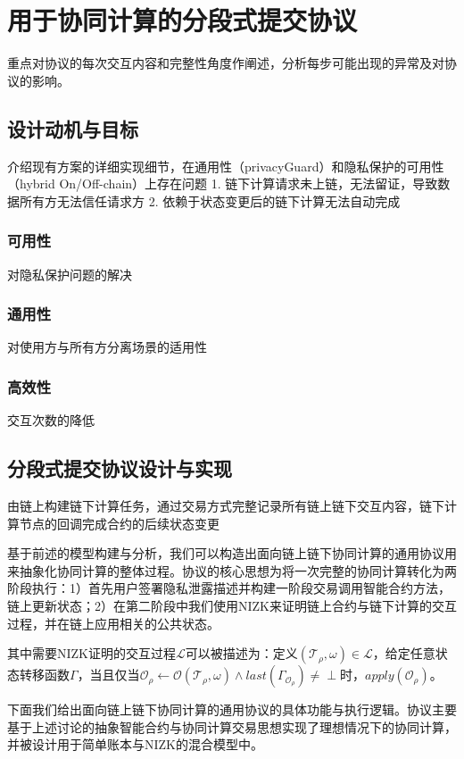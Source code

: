 \chapter{用于协同计算的分段式提交协议}
重点对协议的每次交互内容和完整性角度作阐述，分析每步可能出现的异常及对协议的影响。
\section{设计动机与目标}
介绍现有方案的详细实现细节，在通用性（privacyGuard）和隐私保护的可用性（hybrid On/Off-chain）上存在问题
1. 链下计算请求未上链，无法留证，导致数据所有方无法信任请求方
2. 依赖于状态变更后的链下计算无法自动完成
\subsection{可用性}
对隐私保护问题的解决

\subsection{通用性}
对使用方与所有方分离场景的适用性

\subsection{高效性}
交互次数的降低

\section{分段式提交协议设计与实现}
由链上构建链下计算任务，通过交易方式完整记录所有链上链下交互内容，链下计算节点的回调完成合约的后续状态变更

基于前述的模型构建与分析，我们可以构造出面向链上链下协同计算的通用协议用来抽象化协同计算的整体过程。协议的核心思想为将一次完整的协同计算转化为两阶段执行：1）首先用户签署隐私泄露描述并构建一阶段交易调用智能合约方法，链上更新状态；2）在第二阶段中我们使用NIZK来证明链上合约与链下计算的交互过程，并在链上应用相关的公共状态。

其中需要NIZK证明的交互过程$\mathcal{L}$可以被描述为：定义$(\mathcal{T}_\rho, \omega) \in \mathcal{L}$，给定任意状态转移函数$\Gamma$，当且仅当$\mathcal{O}_\rho \leftarrow \mathcal{O}(\mathcal{T}_\rho, \omega)\wedge last(\Gamma_{\mathcal{O}_\rho}) \neq \perp$时，$apply(\mathcal{O}_\rho)$。

下面我们给出面向链上链下协同计算的通用协议的具体功能与执行逻辑。协议主要基于上述讨论的抽象智能合约与协同计算交易思想实现了理想情况下的协同计算，并被设计用于简单账本与NIZK的混合模型中。

